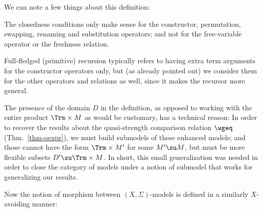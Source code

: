 We can note a few things about this definition:
\begin{mmyitem} 
\item The closedness conditions only make sense for the constructor, permutation, swapping, renaming and substitution operators; and not for the free-variable operator or the freshness relation.
%
\item Full-fledged (primitive) recursion typically refers to having extra term arguments for the constructor operators only, but (as already pointed out) we consider them for the other operators and relations as well, since it makes the recursor more general.
%
\item The presence of the domain $D$ in the definition, as opposed to working with the entire product $\Trm \times M$ as would be customary, has a technical reason: In order to recover the results about the quasi-strength comparison relation $\wgeq$ (Thm.~\ref{thm-qexpr}), we must build submodels of these enhanced models; and those cannot have the form $\Trm \times M'$ for some $M' \su M$, but must be more flexible subsets $D' \su \Trm \times M$. In short, this small generalization was needed in order to close the category of models under a notion of submodel that works for generalizing our results. 
\end{mmyitem} 
\medskip 

Now the notion of morphism between $(X,\Sigma)$-models is defined in a similarly $X$-avoiding manner:

